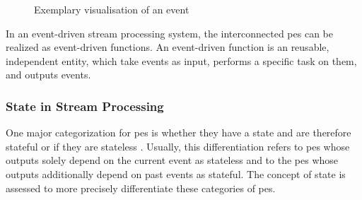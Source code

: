\begin{figure}[H]
    \centering
    \graphicspath{{./figures/code/}}

\caption{Exemplary visualisation of an event}
\label{fMedicalEvent}
\end{figure}

In an event-driven stream processing system, the interconnected \gls{pe}s can be realized as event-driven functions. An event-driven function is an reusable, independent entity, which take events as input, performs a specific task on them, and outputs events.


\subsubsection{State in Stream Processing}
\label{lStateStreamProcessing}

One major categorization for \gls{pe}s is whether they have a state and are therefore stateful or if they are stateless \cite{CastroFernandez.2013}. Usually, this differentiation refers to \gls{pe}s whose outputs solely depend on the current event as stateless and to the \gls{pe}s whose outputs additionally depend on past events as stateful. The concept of state is assessed to more precisely differentiate these categories of \gls{pe}s.\par

